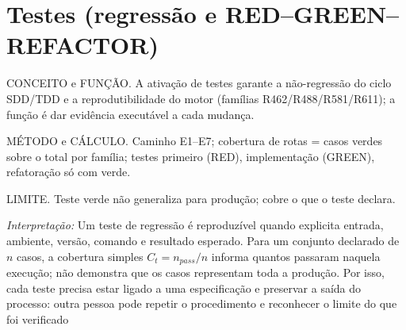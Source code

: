 \section{Testes (regressão e RED--GREEN--REFACTOR)}
\begin{descricao}
CONCEITO e FUNÇÃO. A ativação de testes garante a não-regressão do ciclo
SDD/TDD e a reprodutibilidade do motor (famílias R462/R488/R581/R611); a função
é dar evidência executável a cada mudança.
\end{descricao}
\begin{metodo}
MÉTODO e CÁLCULO. Caminho E1--E7; cobertura de rotas = casos verdes sobre o
total por família; testes primeiro (RED), implementação (GREEN), refatoração só
com verde.
\end{metodo}
\begin{aviso}
LIMITE. Teste verde não generaliza para produção; cobre o que o teste declara.
\end{aviso}
\noindent\textit{Interpretação:} Um teste de regressão é reproduzível quando explicita entrada, ambiente, versão, comando e resultado esperado. Para um conjunto declarado de $n$ casos, a cobertura simples $C_t=n_{pass}/n$ informa quantos passaram naquela execução; não demonstra que os casos representam toda a produção. Por isso, cada teste precisa estar ligado a uma especificação e preservar a saída do processo: outra pessoa pode repetir o procedimento e reconhecer o limite do que foi verificado  %

